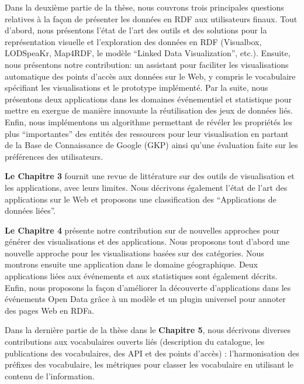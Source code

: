 Dans la deuxi\`{e}me partie de la th\`{e}se, nous couvrons trois principales questions relatives à la façon de pr\'{e}senter les donn\'{e}es en RDF aux utilisateurs finaux. Tout d'abord, nous pr\'{e}sentons l'\'{e}tat de l'art des outils et des solutions pour la repr\'{e}sentation visuelle et l'exploration des donn\'{e}es en RDF (Visualbox, LODSpeaKr, Map4RDF, le mod\`{e}le ``Linked Data Visualization'', etc.). Ensuite, nous pr\'{e}sentons notre contribution: un assistant pour faciliter les visualisations automatique des points d'acc\`{e}s aux donn\'{e}es sur le Web, y compris le vocabulaire sp\'{e}cifiant les visualisations et le prototype impl\'{e}ment\'{e}. Par la suite, nous pr\'{e}sentons deux applications dans les domaines \'{e}v\'{e}nementiel et statistique pour mettre en exergue de mani\`{e}re innovante la r\'{e}utilisation des jeux de donn\'{e}es li\'{e}s. Enfin, nous impl\'{e}mentons un algorithme permettant de r\'{e}v\'{e}ler les propri\'{e}t\'{e}s les plus ``importantes'' des entit\'{e}s des ressources pour leur visualisation en partant de la Base de Connaissance de Google (GKP) ainsi qu'une \'{e}valuation faite sur les pr\'{e}f\'{e}rences des utilisateurs.

\textbf{Le Chapitre 3} fournit une revue de litt\'{e}rature sur des outils de visualisation et les applications, avec leurs limites. Nous d\'{e}crivons \'{e}galement l'\'{e}tat de l'art des applications sur le Web et proposons une classification des ``Applications de donn\'{e}es li\'{e}es''.

\textbf{Le Chapitre 4} pr\'{e}sente notre contribution sur de nouvelles approches pour g\'{e}n\'{e}rer des visualisations et des applications. Nous proposons tout d'abord une nouvelle approche pour les visualisations bas\'{e}es sur des cat\'{e}gories. Nous montrons ensuite une application dans le domaine g\'{e}ographique. Deux applications li\'{e}es aux \'{e}v\'{e}nements et aux statistiques sont \'{e}galement d\'{e}crits. Enfin, nous proposons la façon d'am\'{e}liorer la d\'{e}couverte d'applications dans les \'{e}v\'{e}nements Open Data grâce à un mod\`{e}le et un plugin universel pour annoter des pages Web en RDFa.

Dans la derni\`{e}re partie de la th\`{e}se dans le \textbf{Chapitre 5}, nous d\'{e}crivons diverses contributions aux vocabulaires ouverts li\'{e}s (description du catalogue, les publications des vocabulaires, des API et des points d'acc\`{e}s) : l'harmonisation des pr\'{e}fixes des vocabulaire, les m\'{e}triques pour classer les vocabulaire  en utilisant le contenu de l'information.

